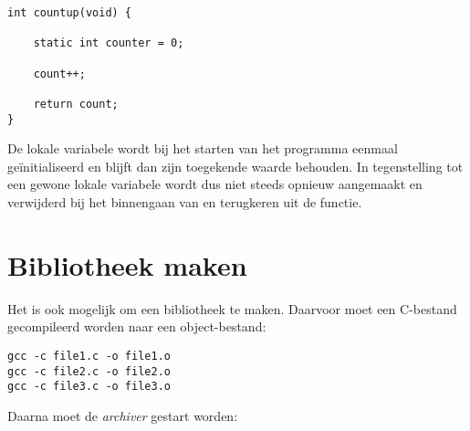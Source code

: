 \begin{lstlisting}[caption=Gebruik van een static lokale variabele.,label=cod:comstaticloc]
int countup(void) {

    static int counter = 0;
    
    count++;
    
    return count;
}
\end{lstlisting}

De lokale variabele  wordt bij het starten van het programma eenmaal geïnitialiseerd en blijft dan zijn toegekende waarde behouden. In tegenstelling tot een gewone lokale variabele wordt  dus niet steeds opnieuw aangemaakt en verwijderd bij het binnengaan van en terugkeren uit de functie.





\section{Bibliotheek maken}
Het is ook mogelijk om een bibliotheek te maken. Daarvoor moet een C-bestand gecompileerd worden naar een object-bestand:

\hspace*{1em}\texttt{gcc -c file1.c -o file1.o}\\
\hspace*{1em}\texttt{gcc -c file2.c -o file2.o}\\
\hspace*{1em}\texttt{gcc -c file3.c -o file3.o}

Daarna moet de \textsl{archiver} gestart worden:

